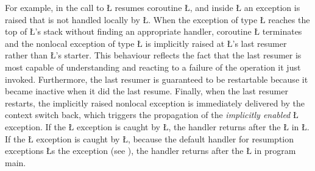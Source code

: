 \documentclass[openright,twoside]{report}
\begin{document}
For example, in  the call to \LGinlinetrue\LGbegin\lgrinde\L{}\endlgrinde\LGend{} resumes coroutine \LGinlinetrue\LGbegin\lgrinde\L{}\endlgrinde\LGend{}, and inside \LGinlinetrue\LGbegin\lgrinde\L{}\endlgrinde\LGend{} an exception is raised that is not handled locally by \LGinlinetrue\LGbegin\lgrinde\L{}\endlgrinde\LGend{}.
When the exception of type \LGinlinetrue\LGbegin\lgrinde\L{}\endlgrinde\LGend{} reaches the top of \LGinlinetrue\LGbegin\lgrinde\L{}\endlgrinde\LGend{}'s stack without finding an appropriate handler, coroutine \LGinlinetrue\LGbegin\lgrinde\L{}\endlgrinde\LGend{} terminates and the nonlocal exception of type \LGinlinetrue\LGbegin\lgrinde\L{}\endlgrinde\LGend{} is implicitly raised at \LGinlinetrue\LGbegin\lgrinde\L{}\endlgrinde\LGend{}'s last resumer rather than \LGinlinetrue\LGbegin\lgrinde\L{}\endlgrinde\LGend{}'s starter.
This behaviour reflects the fact that the last resumer is most capable of understanding and reacting to a failure of the operation it just invoked.
Furthermore, the last resumer is guaranteed to be restartable because it became inactive when it did the last resume.
Finally, when the last resumer restarts, the implicitly raised nonlocal exception is immediately delivered by the context switch back, which triggers the propagation of the \emph{implicitly enabled} \LGinlinetrue\LGbegin\lgrinde\L{}\endlgrinde\LGend{} exception.
If the \LGinlinetrue\LGbegin\lgrinde\L{}\endlgrinde\LGend{} exception is caught by \LGinlinetrue\LGbegin\lgrinde\L{}\endlgrinde\LGend{}, the handler returns after the \LGinlinetrue\LGbegin\lgrinde\L{}\endlgrinde\LGend{} in \LGinlinetrue\LGbegin\lgrinde\L{}\endlgrinde\LGend{}.
If the \LGinlinetrue\LGbegin\lgrinde\L{}\endlgrinde\LGend{} exception is caught by \LGinlinetrue\LGbegin\lgrinde\L{}\endlgrinde\LGend{}, because the default handler for resumption exceptions \LGinlinetrue\LGbegin\lgrinde\L{}\endlgrinde\LGend{}s the exception (see ), the handler returns after the \LGinlinetrue\LGbegin\lgrinde\L{}\endlgrinde\LGend{} in program main.
\end{document}
